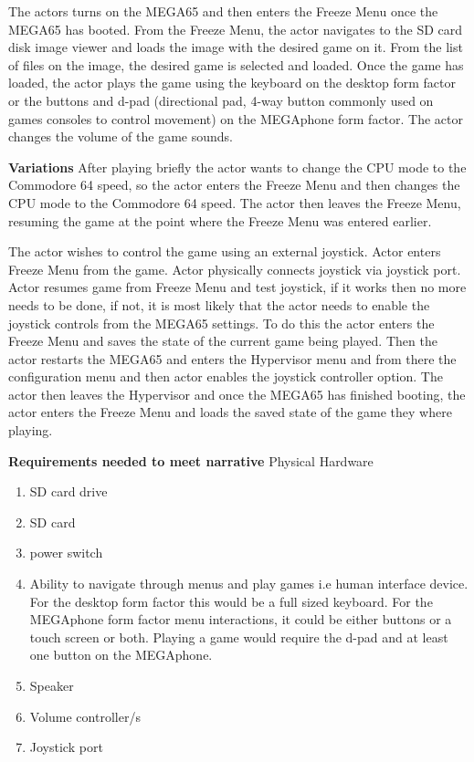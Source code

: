 The actors turns on the MEGA65 and then enters the Freeze Menu once the MEGA65 has booted. From the Freeze Menu, the actor navigates to the SD card disk image viewer and loads the image with the desired game on it. From the list of files on the image, the desired game is selected and loaded. Once the game has loaded, the actor plays the game using the keyboard on the desktop form factor or the buttons and d-pad (directional pad, 4-way button commonly used on games consoles to control movement) on the MEGAphone form factor. The actor changes the volume of the game sounds.

\textbf{Variations}
After playing briefly the actor wants to change the CPU mode to the Commodore 64 speed, so the actor enters the Freeze Menu and then changes the CPU mode to the Commodore 64 speed. The actor then leaves the Freeze Menu, resuming the game at the point where the Freeze Menu was entered earlier. 

The actor wishes to control the game using an external joystick. Actor enters Freeze Menu from the game. Actor physically connects joystick via joystick port. Actor resumes game from Freeze Menu and test joystick, if it works then no more needs to be done, if not, it is most likely that the actor needs to enable the joystick controls from the MEGA65 settings. To do this the actor enters the Freeze Menu and saves the state of the current game being played. Then the actor restarts the MEGA65 and enters the Hypervisor menu and from there the configuration menu and then actor enables the joystick controller option. The actor then leaves the Hypervisor and once the MEGA65 has finished booting, the actor enters the Freeze Menu and loads the saved state of the game they where playing. 

\textbf{Requirements needed to meet narrative}
Physical Hardware
\begin{enumerate}
\item SD card drive
\item SD card
\item power switch
\item Ability to navigate through menus and play games i.e human interface device. For the desktop form factor this would be a full sized keyboard. For the MEGAphone form factor menu interactions, it could be either buttons or a touch screen or both. Playing a game would require the d-pad and at least one button on the MEGAphone.
\item Speaker
\item Volume controller/s
\item Joystick port
\end{enumerate}

